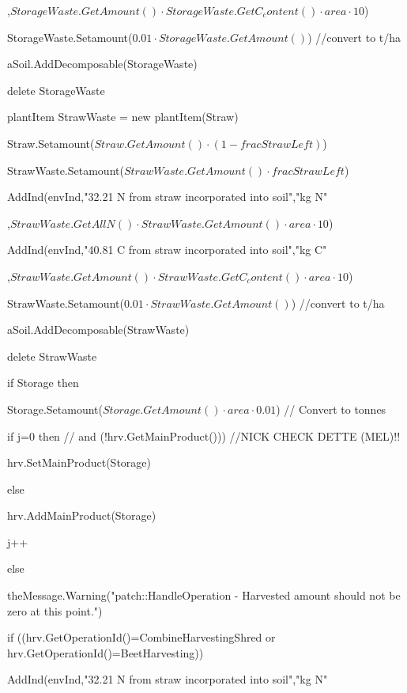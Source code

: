 \documentclass[%
]{scrartcl}
\begin{document}
{{{,$StorageWaste.GetAmount() \cdot StorageWaste.GetC_content() \cdot area \cdot 10$)
        
 StorageWaste.Setamount($0.01 \cdot StorageWaste.GetAmount()$)  //convert to t/ha
       
  aSoil.AddDecomposable(StorageWaste)
        
 delete StorageWaste

 plantItem   StrawWaste = new plantItem(Straw)
        
 Straw.Setamount($Straw.GetAmount() \cdot (1-fracStrawLeft)$)
        
 StrawWaste.Setamount($StrawWaste.GetAmount() \cdot fracStrawLeft$)
         
AddInd(envInd,"32.21 N from straw incorporated into soil","kg N"

,$StrawWaste.GetAllN() \cdot StrawWaste.GetAmount() \cdot area \cdot 10$)
      
   AddInd(envInd,"40.81 C from straw incorporated into soil","kg C"

,$StrawWaste.GetAmount() \cdot StrawWaste.GetC_content() \cdot area \cdot 10$)
        
 StrawWaste.Setamount($0.01 \cdot StrawWaste.GetAmount()$)  //convert to t/ha
        
 aSoil.AddDecomposable(StrawWaste)
     
    delete StrawWaste

         if Storage then
        
          
  \quad Storage.Setamount($Storage.GetAmount() \cdot area \cdot 0.01$)           // Convert to tonnes
          
  \quad if j=0 then // and (!hrv.GetMainProduct()))  //NICK CHECK DETTE (MEL)!!
  
 \quad \quad             hrv.SetMainProduct(Storage)
           
  \quad else

   \quad \quad             hrv.AddMainProduct(Storage)

    \quad \quad         j++
        
       
  else
        
   \quad  theMessage.Warning("patch::HandleOperation - Harvested amount should not be zero at this point.")

    \quad      if ((hrv.GetOperationId()=CombineHarvestingShred  or hrv.GetOperationId()=BeetHarvesting))
        
       
    \quad \quad  AddInd(envInd,"32.21 N from straw incorporated into soil","kg N"

}}}
\end{document}

